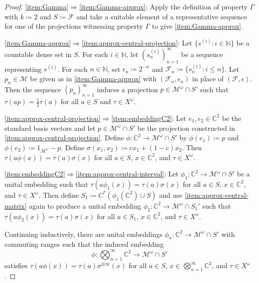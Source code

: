 \documentclass[a4paper,11pt]{amsart}
\theoremstyle{definition}
\numberwithin{equation}{section}
\numberwithin{theorem}{section}
\newcommand{\C}{\mathbb C}
\newcommand{\N}{\mathbb N}
\newcommand{\M}{\mathcal{M}}
\begin{document}
\begin{proof}
\ref{item:Gamma}$\Rightarrow$\ref{item:Gamma-approx}: Apply the definition of property $\Gamma$ with $k \coloneqq 2$ and $S \coloneqq \mathcal F$ and take a suitable element of a representative sequence for one of the projections witnessing property $\Gamma$ to give \ref{item:Gamma-approx}.

\ref{item:Gamma-approx}$\Rightarrow$\ref{item:approx-central-projection}: 
Let $\{s^{(i)}:i\in\N\}$ be a countable dense set in $S$. For each $i\in\N$, let $(s^{(i)}_n)_{n=1}^\infty$ be a sequence representing $s^{(i)}$.
For each $n \in \N$, set $\epsilon_n \coloneqq 2^{-n}$ and $\mathcal{F}_n \coloneqq \{ s^{(i)}_n: i \leq n\}$. Let $p_n \in \M$ be given as in \ref{item:Gamma-approx} with $(\mathcal{F}_n, \epsilon_n)$ in place of $(\mathcal F, \epsilon)$.  Then the sequence $(p_n)_{n=1}^\infty$ induces a projection $p \in \M^\omega \cap S'$ such that $\tau(ap) = \frac{1}{2} \tau(a)$ for all $a \in S$ and $\tau \in X^\omega$.


\ref{item:approx-central-projection}$\Rightarrow$\ref{item:embeddingC2}:
Let $e_1, e_2 \in \mathbb C^2$ be the standard basis vectors and let $p \in \M^\omega \cap S'$ be the projection constructed in \ref{item:approx-central-projection}.
Define $\phi\colon \C^2 \rightarrow \M^\omega \cap S'$ by $\phi(e_1)\coloneqq p$ and $\phi(e_2) \coloneqq  1_{\mathcal M^\omega} -p$.
Define $\sigma(x_1,x_2)\coloneqq cx_1 + (1-c)x_2$. Then $\tau(a\phi(x)) = \tau(a)\sigma(x)$ for all $a \in S$, $x \in \C^2$, and $\tau \in X^\omega$.



\ref{item:embeddingC2}$\Rightarrow$\ref{item:approx-central-interval}:  
Let $\phi_1 \colon \C^2 \rightarrow \M^\omega \cap S'$ be a unital embedding such that $\tau(a\phi_1(x)) = \tau(a)\sigma(x)$ for all $a \in S$, $x \in \C^2$, and $\tau \in X^\omega$. Then define $S_1 \coloneqq  C^*(\phi_1(\C^2) \cup S)$ and use \ref{item:approx-central-matrix} again to produce a unital embedding $\phi_2 \colon \C^2 \rightarrow \M^\omega \cap S_1'$ such that $\tau(a\phi_2(x)) = \tau(a)\sigma(x)$ for all $a \in S_1$, $x \in \C^2$, and $\tau \in X^\omega$.

Continuing inductively, there are unital embeddings $\phi_n \colon \C^2 \rightarrow \M^\omega \cap S'$ with commuting ranges such that the induced embedding
\begin{equation}
	 \phi \colon \bigotimes_{n=1}^\infty \C^2 \rightarrow \M^\omega \cap S'
\end{equation}
satisfies $\tau(a\phi(x)) = \tau(a)\sigma^{\otimes\infty}(x)$ for all $a \in S$, $x \in \bigotimes_{n=1}^\infty\C^2$, and $\tau \in X^\omega$.


\end{proof}
\end{document}
